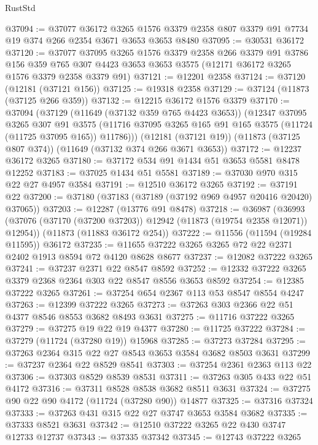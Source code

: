 \begin{lexlean}{RustStd}
\begin{coremodule}
@37094 := @37077
    @36172
    @3265
    @1576
    @3379
    @2358
    @807
    @3379
    @91
    @7734
    @19
    @374
    @266
    @2354
    @3671
    @3653
    @3653
    @8480
@37095 := @30531 @36172
@37120 := @37077
    @37095
    @3265
    @1576
    @3379
    @2358
    @266
    @3379
    @91
    @3786
    @156
    @359
    @765
    @307
    @4423
    @3653
    @3653
    @3575
    (@12171 @36172 @3265 @1576 @3379 @2358 @3379 @91)
@37121 := @12201 @2358
@37124 := @37120 (@12181 (@37121 @156))
@37125 := @19318 @2358
@37129 := @37124 (@11873 (@37125 @266 @359))
@37132 := @12215 @36172 @1576 @3379
@37170 := @37094
    (@37129
      (@11649 (@37132 @359 @765 @4423 @3653))
      (@12347
        @37095
        @3265
        @307
        @91
        @3575
        (@11716 @37095 @3265 @165 @91 @165 @3575 (@11724 (@11725 @37095 @165)) @11786)))
    (@12181 (@37121 @19))
    (@11873 (@37125 @807 @374))
    (@11649 (@37132 @374 @266 @3671 @3653))
@37172 := @12237 @36172 @3265
@37180 := @37172 @534 @91 @1434 @51 @3653 @5581 @8478 @12252
@37183 := @37025 @1434 @51 @5581
@37189 := @37030 @970 @315 @22 @27 @4957 @3584
@37191 := @12510 @36172 @3265
@37192 := @37191 @22
@37200 := @37180 (@37183 (@37189 (@37192 @969 @4957 @20416 @20420) @37065))
@37203 := @12287 (@13776 @91 @8478)
@37218 := @36987
    (@36993 (@37076 (@37170 (@37200 @37203)) @12942 (@11873 (@19754 @2358 @12071)) @12954))
    (@11873 (@11883 @36172 @254))
@37222 := @11556 (@11594 (@19284 @11595)) @36172
@37235 := @11655 @37222 @3265 @3265 @72 @22 @2371 @2402 @1913 @8594 @72 @4120 @8628 @8677
@37237 := @12082 @37222 @3265
@37241 := @37237 @2371 @22 @8547 @8592
@37252 := @12332 @37222 @3265 @3379 @2368 @2364 @303 @22 @8547 @8556 @3653 @8592
@37254 := @12385 @37222 @3265
@37261 := @37254 @654 @2367 @113 @53 @8547 @8554 @4247
@37263 := @12399 @37222 @3265
@37273 := @37263 @303 @2366 @22 @51 @4377 @8546 @8553 @3682 @8493 @3631
@37275 := @11716 @37222 @3265
@37279 := @37275 @19 @22 @19 @4377
@37280 := @11725 @37222
@37284 := @37279 (@11724 (@37280 @19)) @15968
@37285 := @37273 @37284
@37295 := @37263 @2364 @315 @22 @27 @8543 @3653 @3584 @3682 @8503 @3631
@37299 := @37237 @2364 @22 @8529 @8541
@37303 := @37254 @2361 @2363 @113 @22
@37306 := @37303 @8529 @8539 @8531
@37311 := @37263 @305 @433 @22 @51 @4172
@37316 := @37311 @8528 @8538 @3682 @8511 @3631
@37324 := @37275 @90 @22 @90 @4172 (@11724 (@37280 @90)) @14877
@37325 := @37316 @37324
@37333 := @37263 @431 @315 @22 @27 @3747 @3653 @3584 @3682
@37335 := @37333 @8521 @3631
@37342 := @12510 @37222 @3265 @22 @430 @3747 @12733 @12737
@37343 := @37335 @37342
@37345 := @12743 @37222 @3265

\end{coremodule}
\end{lexlean}
